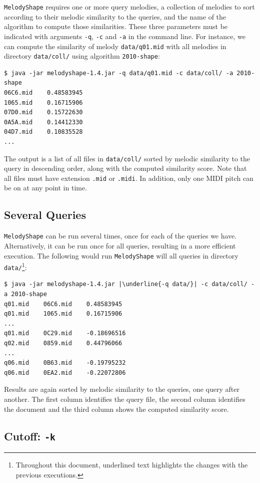 \documentclass[twoside]{article}
\begin{document}
\texttt{MelodyShape} requires one or more query melodies, a collection of melodies to sort according to their melodic similarity to the queries, and the name of the algorithm to compute those similarities. These three parameters must be indicated with arguments \texttt{-q}, \texttt{-c} and \texttt{-a} in the command line. For instance, we can compute the similarity of melody \texttt{data/q01.mid} with all melodies in directory \texttt{data/coll/} using algorithm \texttt{2010-shape}:
\begin{lstlisting}
$ java -jar melodyshape-1.4.jar -q data/q01.mid -c data/coll/ -a 2010-shape
06C6.mid    0.48583945
1065.mid    0.16715906
07D0.mid    0.15722630
0A5A.mid    0.14412330
04D7.mid    0.10835528
...
\end{lstlisting}

The output is a list of all files in \texttt{data/coll/} sorted by melodic similarity to the query in descending order, along with the computed similarity score. Note that all files must have extension \texttt{.mid} or \texttt{.midi}. In addition, only one MIDI pitch can be on at any point in time.

\subsection{Several Queries}

\texttt{MelodyShape} can be run several times, once for each of the queries we have. Alternatively, it can be run once for all queries, resulting in a more efficient execution. The following would run \texttt{MelodyShape} will all queries in directory \texttt{data/}\footnote{Throughout this document, underlined text highlights the changes with the previous executions.}:
\begin{lstlisting}
$ java -jar melodyshape-1.4.jar |\underline{-q data/}| -c data/coll/ -a 2010-shape
q01.mid    06C6.mid    0.48583945
q01.mid    1065.mid    0.16715906
...
q01.mid    0C29.mid    -0.18696516
q02.mid    0859.mid    0.44796066
...
q06.mid    0B63.mid    -0.19795232
q06.mid    0EA2.mid    -0.22072806
\end{lstlisting}

Results are again sorted by melodic similarity to the queries, one query after another. The first column identifies the query file, the second column identifies the document and the third column shows the computed similarity score.

\subsection{Cutoff: \texttt{-k}}
\end{document}
